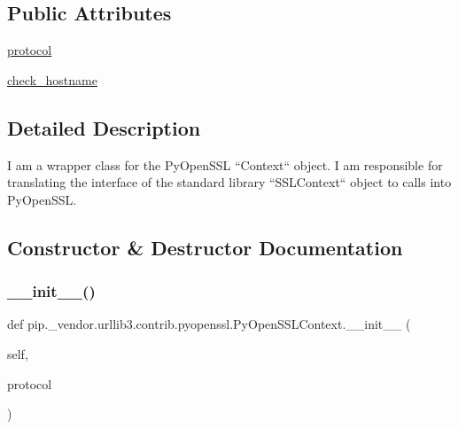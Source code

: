 \subsection*{Public Attributes}
\begin{DoxyCompactItemize}
\item 
\hyperlink{classpip_1_1__vendor_1_1urllib3_1_1contrib_1_1pyopenssl_1_1PyOpenSSLContext_aff9b14a7e2046b5d336bf09b3a538bc1}{protocol}
\item 
\hyperlink{classpip_1_1__vendor_1_1urllib3_1_1contrib_1_1pyopenssl_1_1PyOpenSSLContext_a6dec2f19021f99ce856cb0d8063273dc}{check\+\_\+hostname}
\end{DoxyCompactItemize}


\subsection{Detailed Description}
\begin{DoxyVerb}I am a wrapper class for the PyOpenSSL ``Context`` object. I am responsible
for translating the interface of the standard library ``SSLContext`` object
to calls into PyOpenSSL.
\end{DoxyVerb}
 

\subsection{Constructor \& Destructor Documentation}
\mbox{\label{classpip_1_1__vendor_1_1urllib3_1_1contrib_1_1pyopenssl_1_1PyOpenSSLContext_a19460f70ea5bc68e368276632ce47c4c}} 
\subsubsection{\texorpdfstring{\+\_\+\+\_\+init\+\_\+\+\_\+()}{\_\_init\_\_()}}
{\footnotesize\ttfamily def pip.\+\_\+vendor.\+urllib3.\+contrib.\+pyopenssl.\+Py\+Open\+S\+S\+L\+Context.\+\_\+\+\_\+init\+\_\+\+\_\+ (\begin{DoxyParamCaption}\item[{}]{self,  }\item[{}]{protocol }\end{DoxyParamCaption})}



